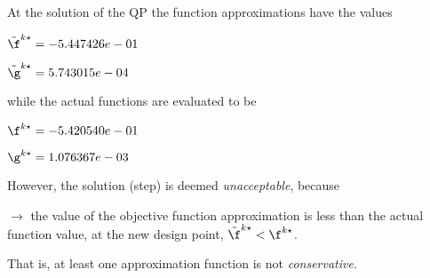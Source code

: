 At the solution of the QP the function approximations have the values

$\tilde \f^{k\star} = -5.447426e-01$

$\tilde \g^{k\star} =  5.743015e-04$

\bigskip
while the actual functions are evaluated to be

$\f^{k\star} = -5.420540e-01$

$\g^{k\star} =  1.076367e-03$

\bigskip
 However, the solution (step)                     is deemed \emph{unacceptable}, because 
 
$\to$ the value of the objective                         function approximation is less than the actual function                         value, at the new design point,                         $\tilde {\f}^{k\star} < {\f}^{k\star}$.

 \bigskip 

 That is, at least one approximation                     function is not \emph{conservative}.
